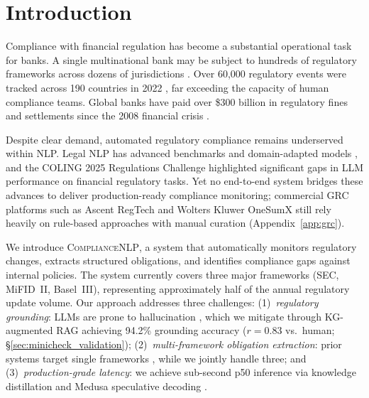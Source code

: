 \documentclass[11pt]{article}
\begin{document}
\section{Introduction}
\label{sec:intro}

Compliance with financial regulation has become a substantial operational task for banks. A single multinational bank may be subject to hundreds of regulatory frameworks across dozens of jurisdictions \citep{du2025nlpfinancesurvey}. Over 60{,}000 regulatory events were tracked across 190 countries in 2022 \citep{thomsonreuters2023cost}, far exceeding the capacity of human compliance teams. Global banks have paid over \$300 billion in regulatory fines and settlements since the 2008 financial crisis \citep{bcg2017bankfines}.

Despite clear demand, automated regulatory compliance remains underserved within NLP. Legal NLP has advanced benchmarks and domain-adapted models \citep{guha2023legalbench,chalkidis2022lexglue,chalkidis2020legalbert}, and the COLING 2025 Regulations Challenge \citep{wang2025colingregs} highlighted significant gaps in LLM performance on financial regulatory tasks. Yet no end-to-end system bridges these advances to deliver production-ready compliance monitoring; commercial GRC platforms such as Ascent RegTech and Wolters Kluwer OneSumX still rely heavily on rule-based approaches with manual curation \citep{jain2025compliancesurvey} (Appendix~\ref{app:grc}).

We introduce \textsc{ComplianceNLP}, a system that automatically monitors regulatory changes, extracts structured obligations, and identifies compliance gaps against internal policies. The system currently covers three major frameworks (SEC, MiFID~II, Basel~III), representing approximately half of the annual regulatory update volume. Our approach addresses three challenges: (1)~\emph{regulatory grounding}: LLMs are prone to hallucination \citep{wang2025factualitysurvey}, which we mitigate through KG-augmented RAG achieving 94.2\% grounding accuracy ($r{=}0.83$ vs.\ human; \S\ref{sec:minicheck_validation}); (2)~\emph{multi-framework obligation extraction}: prior systems target single frameworks \citep{amaral2023derecha,gokhan2025regnlp}, while we jointly handle three; and (3)~\emph{production-grade latency}: we achieve sub-second p50 inference via knowledge distillation \citep{gu2024minillm} and Medusa speculative decoding \citep{cai2024medusa}.
\end{document}
